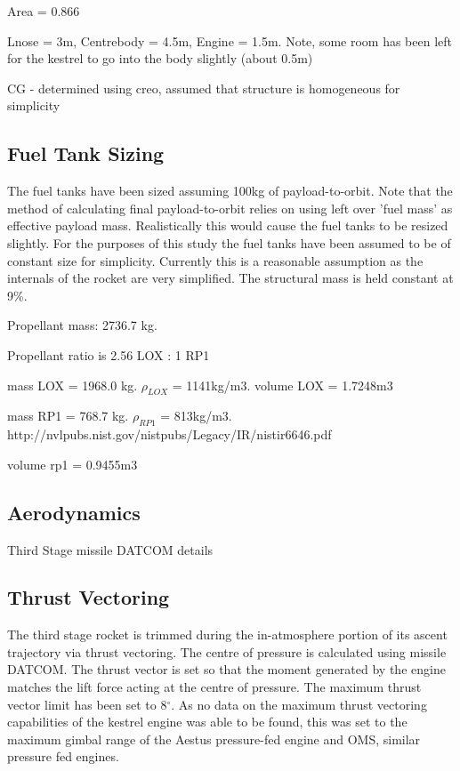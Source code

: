 	
	Area = 0.866
	
	Lnose = 3m, Centrebody = 4.5m, Engine = 1.5m. Note, some room has been left for the kestrel to go into the body slightly (about 0.5m)
	
	CG - determined using creo, assumed that structure is homogeneous for simplicity
		
		\subsection{Fuel Tank Sizing}
		The fuel tanks have been sized assuming 100kg of payload-to-orbit. Note that the method of calculating final payload-to-orbit relies on using left over 'fuel mass' as effective payload mass. Realistically this would cause the fuel tanks to be resized slightly. For the purposes of this study the fuel tanks have been assumed to be of constant size for simplicity. Currently this is a reasonable assumption as the internals of the rocket are very simplified. The structural mass is held constant at 9\%. 
		

		
		Propellant mass: 2736.7 kg.
		
		Propellant ratio is 2.56 LOX : 1 RP1
		
		mass LOX = 1968.0 kg.
		$\rho_{LOX}$ = 1141kg/m3.
		volume LOX = 1.7248m3
		
		
		mass RP1 = 768.7 kg.
		$\rho_{RP1}$ = 813kg/m3.
		http://nvlpubs.nist.gov/nistpubs/Legacy/IR/nistir6646.pdf
		
		volume rp1 = 0.9455m3
		
		
		
		
		
		
		\subsection{Aerodynamics}
		Third Stage missile DATCOM details
		
		\subsection{Thrust Vectoring}
		
		The third stage rocket is trimmed during the in-atmosphere portion of its ascent trajectory via thrust vectoring. The centre of pressure is calculated using missile DATCOM. The thrust vector is set so that the moment generated by the engine matches the lift force acting at the centre of pressure. The maximum thrust vector limit has been set to 8$^\circ$. As no data on the maximum thrust vectoring capabilities of the kestrel engine was able to be found, this was set to the maximum gimbal range of the Aestus pressure-fed engine and OMS, similar pressure fed engines. 
		
